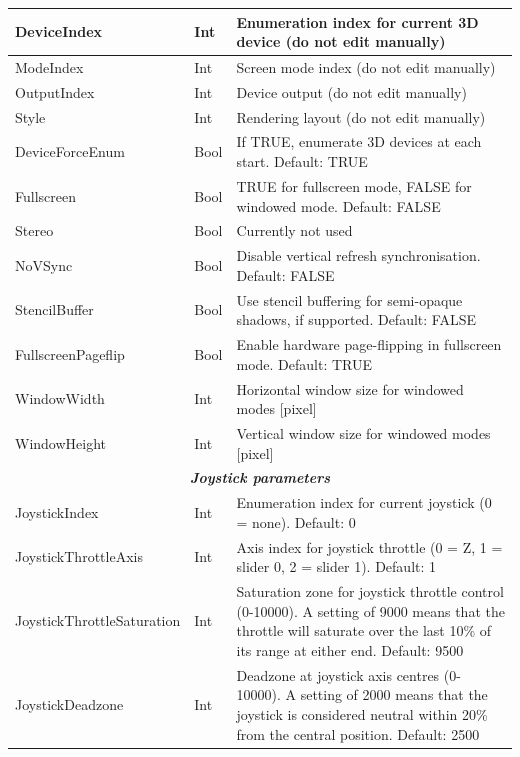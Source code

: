 \documentclass[Orbiter User Manual.tex]{subfiles}
\begin{document}
\begin{longtable}{ |p{}|p{}|p{}| }
	DeviceIndex & Int & Enumeration index for current 3D device (do not edit manually)\\
	\hline\rule{0pt}{2ex}
	ModeIndex & Int & Screen mode index (do not edit manually)\\
	\hline\rule{0pt}{2ex}
	OutputIndex & Int & Device output (do not edit manually)\\
	\hline\rule{0pt}{2ex}
	Style & Int & Rendering layout (do not edit manually)\\
	\hline\rule{0pt}{2ex}
	DeviceForceEnum & Bool & If TRUE, enumerate 3D devices at each start. Default: TRUE\\
	\hline\rule{0pt}{2ex}
	Fullscreen & Bool & TRUE for fullscreen mode, FALSE for windowed mode. Default: FALSE\\
	\hline\rule{0pt}{2ex}
	Stereo & Bool & Currently not used\\
	\hline\rule{0pt}{2ex}
	NoVSync & Bool & Disable vertical refresh synchronisation. Default: FALSE\\
	\hline\rule{0pt}{2ex}
	StencilBuffer & Bool & Use stencil buffering for semi-opaque shadows, if supported. Default: FALSE\\
	\hline\rule{0pt}{2ex}
	FullscreenPageflip & Bool & Enable hardware page-flipping in fullscreen mode. Default: TRUE\\
	\hline\rule{0pt}{2ex}
	WindowWidth & Int & Horizontal window size for windowed modes [pixel]\\
	\hline\rule{0pt}{2ex}
	WindowHeight & Int & Vertical window size for windowed modes [pixel]\\
	\hline
	\multicolumn{3}{|c|}{\rule{0pt}{2ex}\textbf{\textit{Joystick parameters}}}\\
	\hline\rule{0pt}{2ex}
	JoystickIndex & Int & Enumeration index for current joystick (0 = none). Default: 0\\
	\hline\rule{0pt}{2ex}
	JoystickThrottleAxis & Int & Axis index for joystick throttle (0 = Z, 1 = slider 0, 2 = slider 1). Default: 1\\
	\hline\rule{0pt}{2ex}
	JoystickThrottleSaturation & Int & Saturation zone for joystick throttle control (0-10000). A setting of 9000 means that the throttle will saturate over the last 10\% of its range at either end. Default: 9500\\
	\hline\rule{0pt}{2ex}
	JoystickDeadzone & Int & Deadzone at joystick axis centres (0-10000). A setting of 2000 means that the joystick is considered neutral within 20\% from the central position. Default: 2500\\

\end{longtable}
\end{document}
